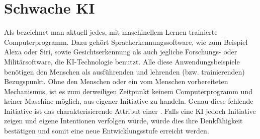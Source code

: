 \documentclass[12pt,german,ngerman]{report}
\begin{document}
    \section{Schwache KI}
        Als  bezeichnet man aktuell jedes,
        mit maschinellem Lernen trainierte Computerprogramm. 
        Dazu gehört Spracherkennungssoftware, wie zum Beispiel Alexa oder Siri,
        sowie Gesichtserkennung als auch jegliche Forschungs- oder Militärsoftware, die KI-Technologie benutzt.
        Alle diese Anwendungsbeispiele benötigen den Menschen als ausführenden und lehrenden (bzw. trainierenden)
        Bezugspunkt.
        Ohne den Menschen oder ein vom Menschen vorbereiteten Mechanismus, ist es zum derweiligen Zeitpunkt
        keinem Computerprogramm und keiner Maschine möglich, aus eigener Initiative zu handeln.
        Genau diese fehlende Initiative ist das charakterisierende Attribut einer .
        Falls eine KI jedoch Initiative zeigen und eigene Intentionen verfolgen würde, würde dies 
        ihre Denkfähigkeit bestätigen und somit eine neue Entwicklungsstufe erreicht werden.
    \newpage
\end{document}
